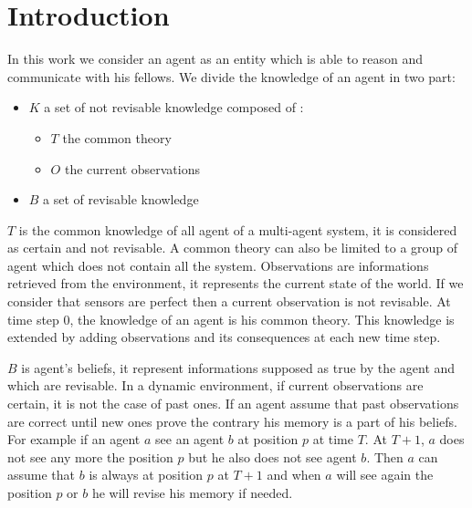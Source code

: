\documentclass{aamas2012}
\begin{document}



\section{Introduction}

	In this work we consider an agent as an entity which is able to reason and communicate with his fellows.
	We divide the knowledge of an agent in two part:\newline
		\begin{itemize}
			\item $K$ a set of not revisable knowledge composed of :
			\begin{itemize}
				\item $T$ the common theory
				\item $O$ the current observations
			\end{itemize}
			\item $B$ a set of revisable knowledge
		\end{itemize}
	
	$T$ is the common knowledge of all agent of a multi-agent system, it is considered as certain and not revisable.
	A common theory can also be limited to a group of agent which does not contain all the system.
	Observations are informations retrieved from the environment, it represents the current state of the world.
	If we consider that sensors are perfect then a current observation is not revisable.
	At time step 0, the knowledge of an agent is his common theory.
	This knowledge is extended by adding observations and its consequences at each new time step.

	$B$ is agent's beliefs, it represent informations supposed as true by the agent and which are revisable.
	In a dynamic environment, if current observations are certain, it is not the case of past ones.
	If an agent assume that past observations are correct until new ones prove the contrary his memory is a part of his beliefs.
	For example if an agent $a$ see an agent $b$ at position $p$ at time $T$.
	At $T+1$, $a$ does not see any more the position $p$ but he also does not see agent $b$.
	Then $a$ can assume that $b$ is always at position $p$ at $T+1$ and when $a$ will see again the position $p$ or $b$ he will revise his memory if needed.
\end{document}
